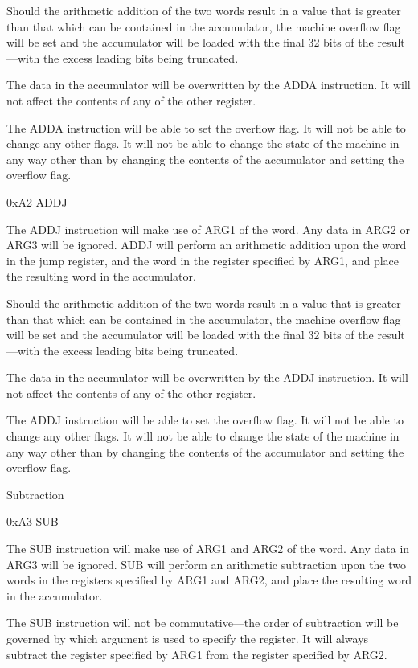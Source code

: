 \documentclass[]{article}
\begin{document}
Should the arithmetic addition of the two words result in a value that
is greater than that which can be contained in the accumulator, the
machine overflow flag will be set and the accumulator will be loaded
with the final 32 bits of the result---with the excess leading bits
being truncated.

The data in the accumulator will be overwritten by the ADDA instruction.
It will not affect the contents of any of the other register.~

The ADDA instruction will be able to set the overflow flag. It will not
be able to change any other flags. It will not be able to change the
state of the machine in any way other than by changing the contents of
the accumulator and setting the overflow flag.

0xA2 ADDJ

The ADDJ instruction will make use of ARG1 of the word. Any data in ARG2
or ARG3 will be ignored. ADDJ will perform an arithmetic addition upon
the word in the jump register, and the word in the register specified by
ARG1, and place the resulting word in the accumulator.

Should the arithmetic addition of the two words result in a value that
is greater than that which can be contained in the accumulator, the
machine overflow flag will be set and the accumulator will be loaded
with the final 32 bits of the result---with the excess leading bits
being truncated.

The data in the accumulator will be overwritten by the ADDJ instruction.
It will not affect the contents of any of the other register.~

The ADDJ instruction will be able to set the overflow flag. It will not
be able to change any other flags. It will not be able to change the
state of the machine in any way other than by changing the contents of
the accumulator and setting the overflow flag.

Subtraction

0xA3 SUB

The SUB instruction will make use of ARG1 and ARG2 of the word. Any data
in ARG3 will be ignored. SUB will perform an arithmetic subtraction upon
the two words in the registers specified by ARG1 and ARG2, and place the
resulting word in the accumulator.

The SUB instruction will not be commutative---the order of subtraction
will be governed by which argument is used to specify the register. It
will always subtract the register specified by ARG1 from the register
specified by ARG2.
\end{document}
